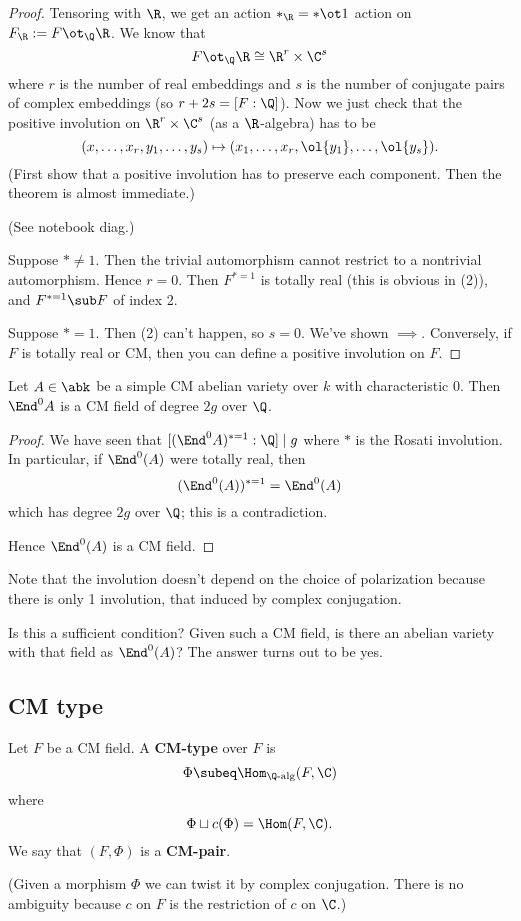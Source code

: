 \begin{proof}
Tensoring with $\R$, we get an action $*_{\R}=*\ot1$ action on $F_{\R}:=F\ot_{\Q}\R$. We know that
\[
F\ot_{\Q} \R\cong \R^r\times \C^s
\]
where $r$ is the number of real embeddings and $s$ is the number of conjugate pairs of complex embeddings (so $r+2s=[F:\Q]$). Now we just check that the positive involution on $\R^r\times \C^s$ (as a $\R$-algebra) has to be
\[
(x,\ldots, x_r,y_1,\ldots, y_s)\mapsto (x_1,\ldots, x_r,\ol{y_1},\ldots, \ol{y_s}).
\]
(First show that a positive involution has to preserve each component. Then the theorem is almost immediate.)

(See notebook diag.) %

Suppose $*\ne 1$. Then the trivial automorphism cannot restrict to a nontrivial automorphism. Hence $r=0$. Then $F^{*=1}$ is totally real (this is obvious in (2)), and $F^{*=1}\sub F$ of index 2.

Suppose $*=1$. Then (2) can't happen, so $s=0$. We've shown $\implies$. Conversely, if $F$ is totally real or CM, then you can define a positive involution on $F$.
\end{proof}
\begin{pr}
Let $A\in \abk$ be a simple CM abelian variety over $k$ with characteristic 0. Then $\End^0A$ is a CM field of degree $2g$ over $\Q$. 
\end{pr}
\begin{proof}
We have seen that $[(\End^0A)^{*=1}:\Q]\mid g$ where $*$ is the Rosati involution. In particular, if $\End^0(A)$ were totally real, then
\[
(\End^0(A))^{*=1}=\End^0(A)
\]
which has degree $2g$ over $\Q$; this is a contradiction.

Hence $\End^0(A)$ is a CM field.
\end{proof}
Note that the involution doesn't depend on the choice of polarization because there is only 1 involution, that induced by complex conjugation.

Is this a sufficient condition?
Given such a CM field, is there an abelian variety with that field as $\End^0(A)$? The answer turns out to be yes.

\subsection{CM type}

\begin{df}
Let $F$ be a CM field. A \textbf{CM-type} over $F$ is
\[
\Phi\subeq \Hom_{\Q\text{-alg}} (F,\C)
\]
where
\[
\Phi\sqcup c(\Phi)=\Hom(F,\C).
\]
We say that $(F,\Phi)$ is a \textbf{CM-pair}.
\end{df}
(Given a morphism $\Phi$ we can twist it by complex conjugation. There is no ambiguity because $c$ on $F$ is the  restriction of $c$ on $\C$.)

